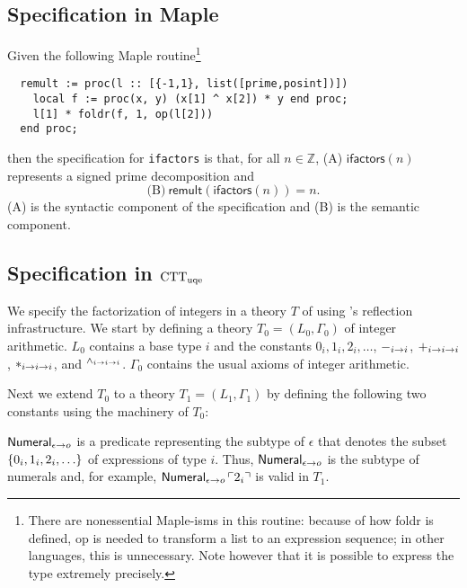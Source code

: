 \documentclass[fleqn]{llncs}
\begin{document}
\subsection{Specification in Maple}

Given the following Maple routine\footnote{There are nonessential
  Maple-isms in this routine: because of how \textsf{foldr} is
  defined, \textsf{op} is needed to transform a list to an expression
  sequence; in other languages, this is unnecessary.  Note however
  that it is possible to express the type extremely precisely.}
\begin{verbatim}
  remult := proc(l :: [{-1,1}, list([prime,posint])]) 
    local f := proc(x, y) (x[1] ^ x[2]) * y end proc;
    l[1] * foldr(f, 1, op(l[2]))
  end proc; 
\end{verbatim}
\noindent then the specification for \texttt{ifactors} is that, for
all $n\in \mathbb{Z}$, (A) $\mathsf{ifactors}(n)$ represents a signed
prime decomposition and 
\[ \text{(B)}~\mathsf{remult}\left(\mathsf{ifactors}\left(n\right)\right) = n. \]
(A) is the syntactic component of the specification and (B) is the
semantic component.

\subsection{Specification in ${\rm CTT}_{\rm uqe}$}

We specify the factorization of integers in a theory $T$ of
{\churchuqe} using {\churchuqe}'s reflection infrastructure.  We start
by defining a theory $T_0 = (L_0,\Gamma_0)$ of integer arithmetic.
$L_0$ contains a base type $i$ and the constants $0_i, 1_i,
2_i,\ldots$, $-_{i \rightarrow i}$, $+_{i \rightarrow i \rightarrow i}$, $*_{i
  \rightarrow i \rightarrow i}$, and $\phantom{}^{{\wedge}_{i \rightarrow i
    \rightarrow i}}$.  $\Gamma_0$ contains the usual axioms of integer
arithmetic.

Next we extend $T_0$ to a theory $T_1 = (L_1,\Gamma_1)$ by defining 
the following two constants using the machinery of $T_0$:

\be

  \item $\mbox{\sf Numeral}_{\epsilon \rightarrow o}$ is a predicate
    representing the subtype of $\epsilon$ that denotes the subset
    ${\{ 0_i, 1_i, 2_i,\ldots \}}$ of expressions of type $i$.  Thus,
    $\mbox{\sf Numeral}_{\epsilon \rightarrow o}$ is the subtype of numerals
    and, for example, $\mbox{\sf Numeral}_{\epsilon \rightarrow o}\,
    \ulcorner2_i\urcorner$ is valid in $T_1$.
\end{document}
